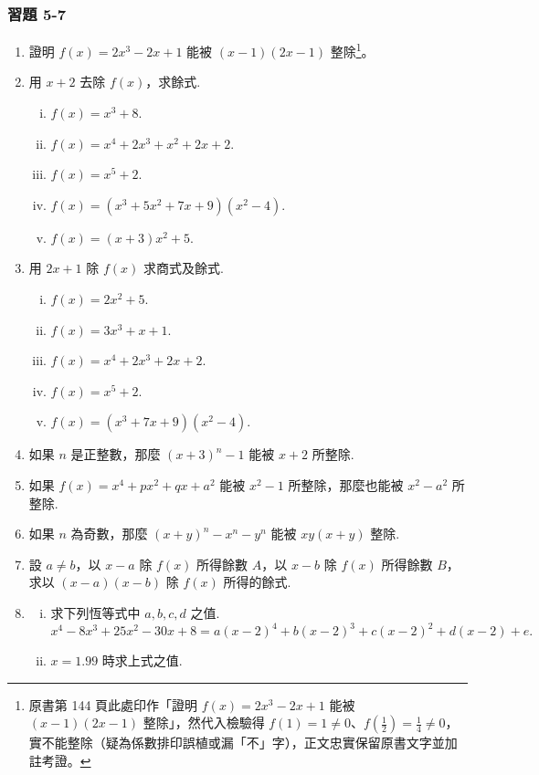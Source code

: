 \subsubsection*{習題 5-7}\label{sec:ex5-7}

\begin{enumerate}[1.]
  \item 證明 $f(x)=2x^3-2x+1$ 能被 $(x-1)(2x-1)$ 整除\footnote{原書第 144 頁此處印作「證明 $f(x)=2x^3-2x+1$ 能被 $(x-1)(2x-1)$ 整除」，然代入檢驗得 $f(1)=1 \neq 0$、$f(\frac{1}{2})=\frac{1}{4} \neq 0$，實不能整除（疑為係數排印誤植或漏「不」字），正文忠實保留原書文字並加註考證。}。
  \item 用 $x+2$ 去除 $f(x)$，求餘式.
  \begin{enumerate}[(i)]
    \item $f(x)=x^3+8$.
    \item $f(x)=x^4+2x^3+x^2+2x+2$.
    \item $f(x)=x^5+2$.
    \item $f(x)=(x^3+5x^2+7x+9)(x^2-4)$.
    \item $f(x)=(x+3)x^2+5$.
  \end{enumerate}

  \item 用 $2x+1$ 除 $f(x)$ 求商式及餘式.
  \begin{enumerate}[(i)]
    \item $f(x)=2x^2+5$.
    \item $f(x)=3x^3+x+1$.
    \item $f(x)=x^4+2x^3+2x+2$.
    \item $f(x)=x^5+2$.
    \item $f(x)=(x^3+7x+9)(x^2-4)$.
  \end{enumerate}

  \item 如果 $n$ 是正整數，那麼 $(x+3)^n-1$ 能被 $x+2$ 所整除.
  \item 如果 $f(x)=x^4+px^2+qx+a^2$ 能被 $x^2-1$ 所整除，那麼也能被 $x^2-a^2$ 所整除.
  \item 如果 $n$ 為奇數，那麼 $(x+y)^n-x^n-y^n$ 能被 $xy(x+y)$ 整除.
  \item 設 $a \neq b$，以 $x-a$ 除 $f(x)$ 所得餘數 $A$，以 $x-b$ 除 $f(x)$ 所得餘數 $B$，求以 $(x-a)(x-b)$ 除 $f(x)$ 所得的餘式.
  \item 
  \begin{enumerate}[(i)]
    \item 求下列恆等式中 $a, b, c, d$ 之值.
    \begin{equation*}
      x^4-8x^3+25x^2-30x+8 = a(x-2)^4+b(x-2)^3+c(x-2)^2+d(x-2)+e.
    \end{equation*}
    \item $x=1.99$ 時求上式之值.
  \end{enumerate}


\end{enumerate}
